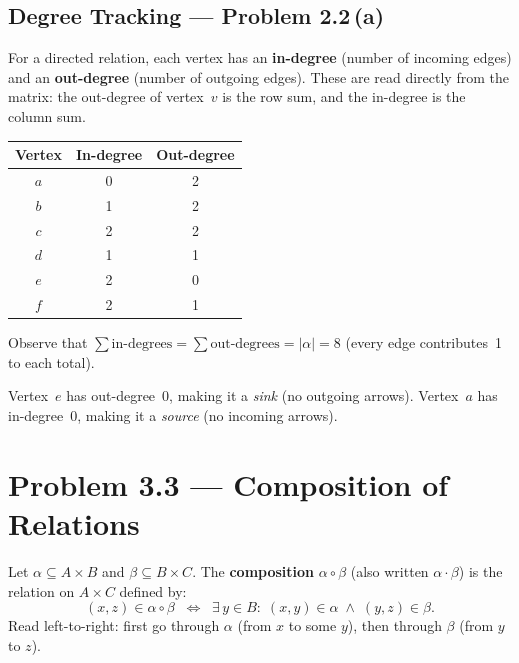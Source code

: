 \documentclass[12pt, a4paper]{article}
\begin{document}
\subsection*{Degree Tracking --- Problem 2.2\,(a)}

For a directed relation, each vertex has an \textbf{in-degree} (number of incoming edges) and an \textbf{out-degree} (number of outgoing edges).  These are read directly from the matrix: the out-degree of vertex~$v$ is the row sum, and the in-degree is the column sum.

\begin{center}
\renewcommand{\arraystretch}{1.2}
\begin{tabular}{c|c|c}
  \toprule
  \textbf{Vertex} & \textbf{In-degree} & \textbf{Out-degree} \\
  \midrule
  $a$ & 0 & 2 \\
  $b$ & 1 & 2 \\
  $c$ & 2 & 2 \\
  $d$ & 1 & 1 \\
  $e$ & 2 & 0 \\
  $f$ & 2 & 1 \\
  \bottomrule
\end{tabular}
\end{center}

Observe that $\sum \text{in-degrees} = \sum \text{out-degrees} = |\alpha| = 8$ (every edge contributes~1 to each total).

Vertex~$e$ has out-degree~0, making it a \emph{sink} (no outgoing arrows).
Vertex~$a$ has in-degree~0, making it a \emph{source} (no incoming arrows).

\newpage
\section{Problem 3.3 --- Composition of Relations}

\begin{theorybox}
Let $\alpha \subseteq A \times B$ and $\beta \subseteq B \times C$.  The \textbf{composition} $\alpha \circ \beta$ (also written $\alpha \cdot \beta$) is the relation on $A \times C$ defined by:
\[
  (x, z) \in \alpha \circ \beta
  \;\;\Longleftrightarrow\;\;
  \exists\, y \in B:\;
  (x, y) \in \alpha \;\land\; (y, z) \in \beta.
\]
Read left-to-right: first go through $\alpha$ (from $x$ to some $y$), then through $\beta$ (from $y$ to $z$).
\end{theorybox}
\end{document}
